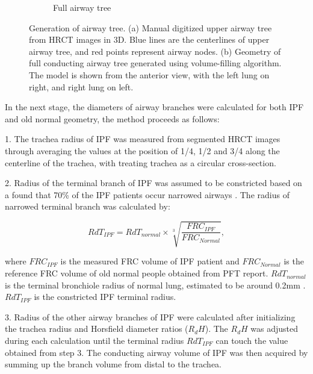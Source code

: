 \begin{figure}[htbp]
\begin{subfigure}{.425\linewidth}
  \caption{Full airway tree}
  \label{fig:AirwayGeneration-b} 
\end{subfigure}
\caption{Generation of airway tree. (a) Manual digitized upper airway tree from HRCT images in 3D. Blue lines are the centerlines of upper airway tree, and red points represent airway nodes. (b) Geometry of full conducting airway tree generated using volume-filling algorithm. The
model is shown from the anterior view, with the left lung on right, and right lung on left.} 
\label{fig:AirwayGeneration}
\end{figure}

In the next stage, the diameters of airway branches were calculated for both IPF and old normal geometry, the method proceeds as follows:

1. The trachea radius of IPF was measured from segmented HRCT images through averaging the values at the position of 1/4, 1/2 and 3/4 along the centerline of the trachea, with treating trachea as a circular cross-section.

2. Radius of the terminal branch of IPF was assumed to be constricted based on a found that 70\% of the IPF patients occur narrowed airways \citep{crystal1976idiopathic}. The radius of narrowed terminal branch was calculated by:

\begin{equation}
 \label{eq:NarrowedTerminalRadius}
 RdT_{IPF} = RdT_{normal} \times \sqrt[3]{\frac{FRC_{IPF}}{FRC_{Normal}}},
\end{equation}

\noindent where $FRC_{IPF}$ is the measured FRC volume of IPF patient and $FRC_{Normal}$ is the reference FRC volume of old normal people obtained from PFT report. $RdT_{normal}$ is the terminal bronchiole radius of normal lung, estimated to be around 0.2mm \citep{horsfield1976diameter}. $RdT_{IPF}$ is the constricted IPF terminal radius. 

3. Radius of the other airway branches of IPF were calculated after initializing the trachea radius and Horsfield diameter ratios ($R_dH$). The $R_dH$ was adjusted during each calculation until the terminal radius $RdT_{IPF}$ can touch the value obtained from step 3. The conducting airway volume of IPF was then acquired by summing up the branch volume from distal to the trachea.

